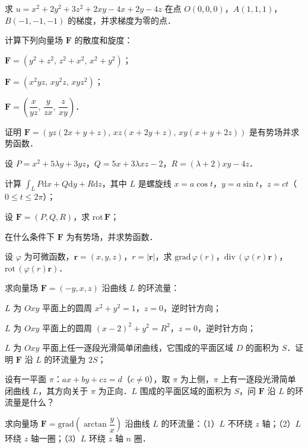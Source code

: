 \begin{xiti}
\item 求 $u=x^{2}+2y^{2}+3z^{2}+2xy-4x+2y-4z$ 在点 $O(0,0,0)$，$A(1,1,1)$，$B(-1,-1,-1)$ 的梯度，并求梯度为零的点．
\item 计算下列向量场 $\bm{F}$ 的散度和旋度：
\begin{ziti}
\item $\bm{F}=(y^{2}+z^{2},\,z^{2}+x^{2},\,x^{2}+y^{2})$；
\item $\bm{F}=(x^{2}yz,\,xy^{2}z,\,xyz^{2})$；
\item $\bm{F}=\left(\dfrac{x}{yz},\,\dfrac{y}{zx},\,\dfrac{z}{xy}\right)$．
\end{ziti}
\item 证明 $\bm{F}=(yz(2x+y+z),\,xz(x+2y+z),\,xy(x+y+2z))$ 是有势场并求势函数．
\item 设 $P=x^{2}+5\lambda y+3yz$，$Q=5x+3\lambda xz-2$，$R=(\lambda+2)xy-4z$．
\begin{ziti}
\item 计算 $\displaystyle\int_{L}P\mathrm{d}x+Q\mathrm{d}y+R\mathrm{d}z$，其中 $L$ 是螺旋线 $x=a\cos t$，$y=a\sin t$，$z=ct$（$0\leqslant t\leqslant 2\pi$）；
\item 设 $\bm{F}=(P,Q,R)$，求 $\mathrm{rot}\,\bm{F}$；
\item 在什么条件下 $\bm{F}$ 为有势场，并求势函数．
\end{ziti}
\item 设 $\varphi$ 为可微函数，$\bm{r}=(x,y,z)$，$r=|\bm{r}|$，求 $\mathrm{grad}\,\varphi(r)$，$\mathrm{div}\,(\varphi(r)\bm{r})$，$\mathrm{rot}\,(\varphi(r)\bm{r})$．
\item 求向量场 $\bm{F}=(-y,x,z)$ 沿曲线 $L$ 的环流量：
\begin{ziti}
\item $L$ 为 $Oxy$ 平面上的圆周 $x^{2}+y^{2}=1$，$z=0$，逆时针方向；
\item $L$ 为 $Oxy$ 平面上的圆周 $(x-2)^{2}+y^{2}=R^{2}$，$z=0$，逆时针方向；
\item $L$ 为 $Oxy$ 平面上任一逐段光滑简单闭曲线，它围成的平面区域 $D$ 的面积为 $S$．证明 $\bm{F}$ 沿 $L$ 的环流量为 $2S$；
\item 设有一平面 $\pi$：$ax+by+cz=d$（$c\neq 0$），取 $\pi$ 为上侧，$\pi$ 上有一逐段光滑简单闭曲线 $L$，其方向关于 $\pi$ 为正向．$L$ 围成的平面区域的面积为 $S$，问 $\bm{F}$ 沿 $L$ 的环流量是什么？
\end{ziti}
\item 求向量场 $\bm{F}=\mathrm{grad}\left(\arctan\dfrac{y}{x}\right)$ 沿曲线 $L$ 的环流量：（1）$L$ 不环绕 $z$ 轴；（2）$L$ 环绕 $z$ 轴一圈；（3）$L$ 环绕 $z$ 轴 $n$ 圈．

\end{xiti}
